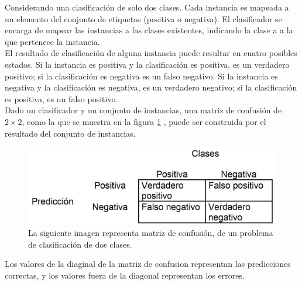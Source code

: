 Considerando una clasificación de solo dos clases. Cada instancia es mapeada a un elemento del conjunto de etiquetas (positiva o negativa). El clasificador se encarga de mapear las instancias a las clases existentes, indicando la clase a a la que pertenece la instancia.\\
El resultado de clasificación de alguna instancia puede resultar en cuatro posibles estados. Si la instancia es positiva y la clasificación es positiva, es un verdadero positivo; si la clasificación es negativa es un falso negativo. Si la instancia es negativa y la clasificación es negativa, es un verdadero negativo; si la clasificación es positiva, es un falso positivo. \\ 
Dado un clasificador y un conjunto de instancias, una matriz de confusión de $2 \times 2$, como la que se muestra en la figura \ref{fig:Matrix} , puede ser construida por el resultado del conjunto de instancias.   
\begin{figure}[h!]
\begin{center}
\includegraphics[scale=.4]{./Figures/MatrixConfusion.png}
\end{center}
\caption{La siguiente imagen representa matriz de confusión, de un problema de clasificación de dos clases.}
\label{fig:Matrix}
\end{figure}
Los valores de la diaginal de la matriz de confusion representan las predicciones correctas, y los valores fuera de la diagonal representan los errores.

